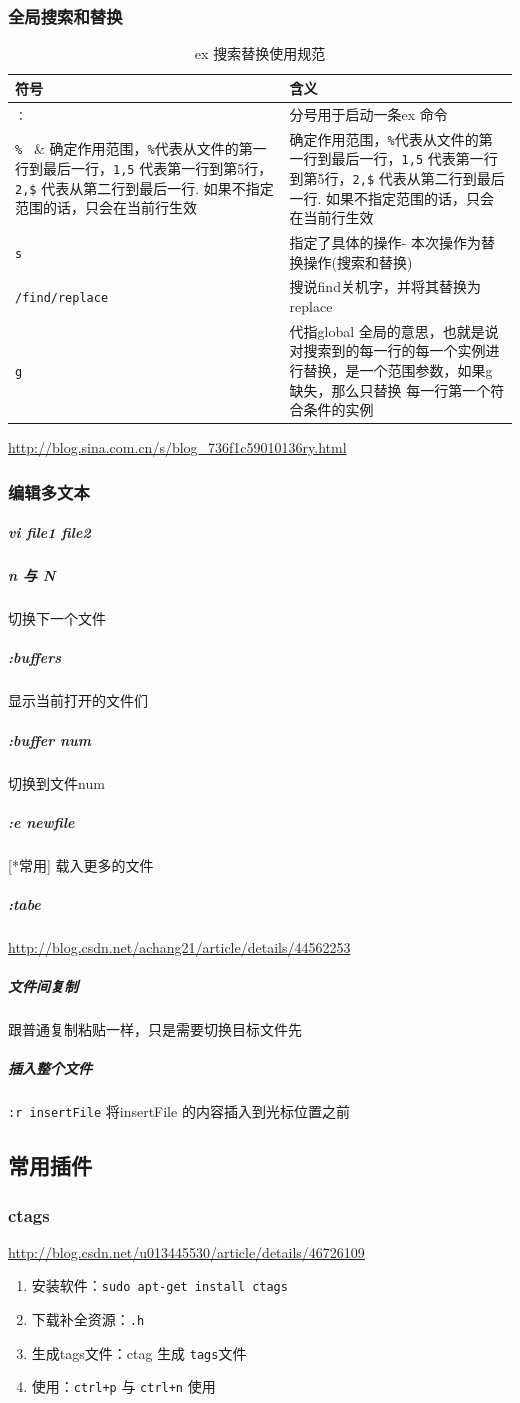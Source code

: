 \documentclass[UTF8,a4paper,12pt]{ctexbook}
\begin{document}
			\subsubsection{全局搜索和替换}
				\begin{table}[H]
					\centering
					\caption{ex 搜索替换使用规范}
					\begin{tabular}{l|m{13cm}}
						\hline
						符号 	   	   & 含义\\
						\hline
						\verb|：|	&  分号用于启动一条ex 命令\\
						\verb|% |	 &  确定作用范围，\verb|%|代表从文件的第一行到最后一行，\verb|1,5| 代表第一行到第5行，\verb|2,$| 代表从第二行到最后一行. 如果不指定范围的话，只会在当前行生效\\
						\verb|s |	 &  指定了具体的操作- 本次操作为替换操作(搜索和替换)\\
						\verb|/find/replace|		&  搜说find关机字，并将其替换为replace\\
						\verb|g |	 &  代指global 全局的意思，也就是说对搜索到的每一行的每一个实例进行替换，是一个范围参数，如果g 缺失，那么只替换 每一行第一个符合条件的实例\\
						\hline
					\end{tabular}
				\end{table}	
				\url{http://blog.sina.com.cn/s/blog_736f1c59010136ry.html}
			
			\subsubsection{编辑多文本}
				\subparagraph{vi file1 file2 }
				\subparagraph{n 与 N} 切换下一个文件
				\subparagraph{:buffers} 显示当前打开的文件们
				\subparagraph{:buffer num} 切换到文件num
				
				\subparagraph{:e newfile}[*常用] 载入更多的文件 
				\subparagraph{:tabe}
				\url{http://blog.csdn.net/achang21/article/details/44562253}
				\subparagraph{文件间复制} 跟普通复制粘贴一样，只是需要切换目标文件先
				\subparagraph{插入整个文件} \verb|:r insertFile| 将insertFile 的内容插入到光标位置之前 				
		\subsection{常用插件}
			\subsubsection{ctags}
				\url{http://blog.csdn.net/u013445530/article/details/46726109}
				\begin{enumerate}
					\item 安装软件：\verb|sudo apt-get install ctags|
					\item 下载补全资源：\verb|.h|
					\item 生成tags文件：ctag 生成 \verb|tags|文件
					\item 使用：\verb|ctrl+p| 与 \verb|ctrl+n| 使用
				\end{enumerate}
				
\end{document}
